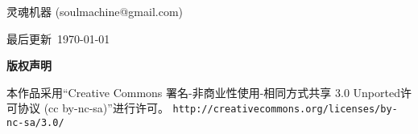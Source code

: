 \thispagestyle{plain}
\begin{center}
  {\LARGE\textbf{\BookTitle}}

  \vspace{1em}
  {\large 灵魂机器 (soulmachine@gmail.com)}

  \vspace{1ex}
  
  \vspace{1ex}
  最后更新\, \today\, \thistime
  
  \vspace{1em}
  \textbf{\large 版权声明}
\end{center}
\noindent 本作品采用“Creative Commons 署名-非商业性使用-相同方式共享 3.0 Unported许可协议 
(cc by-nc-sa)”进行许可。
\texttt{\small http://creativecommons.org/licenses/by-nc-sa/3.0/}

\vspace{1em}
